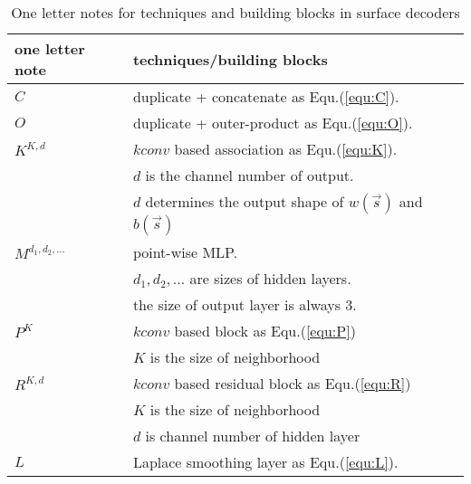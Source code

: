 \begin{table}
	\caption{One letter notes for techniques and building blocks in surface decoders}
	\label{tab:note}
	\centering
	\begin{tabular}{l | l }
	one letter note & techniques/building blocks\\
	\hline
	$C$ & duplicate + concatenate as Equ.(\ref{equ:C}).\\
	$O$ & duplicate + outer-product as Equ.(\ref{equ:O}).\\
	$K^{K,d}$ & $kconv$ based association as Equ.(\ref{equ:K}).\\
		     ~& $d$ is the channel number of output.\\
		     & $d$ determines the output shape of $w(\vec{s})$ and $b(\vec{s})$\\
	$M^{d_1,d_2,\dots}$ & point-wise MLP.\\
					   ~& $d_1,d_2,\dots$ are sizes of hidden layers.\\
					   ~& the size of output layer is always 3.\\
	$P^{K}$			    & $kconv$ based block as Equ.(\ref{equ:P}) \\
					   ~& $K$ is the size of neighborhood\\
	$R^{K,d}$           & $kconv$ based residual block as Equ.(\ref{equ:R})\\
					   ~& $K$ is the size of neighborhood\\ 
					   ~& $d$ is channel number of hidden layer\\
	$L$                 & Laplace smoothing layer as Equ.(\ref{equ:L}).\\
	\end{tabular}	
\end{table}


